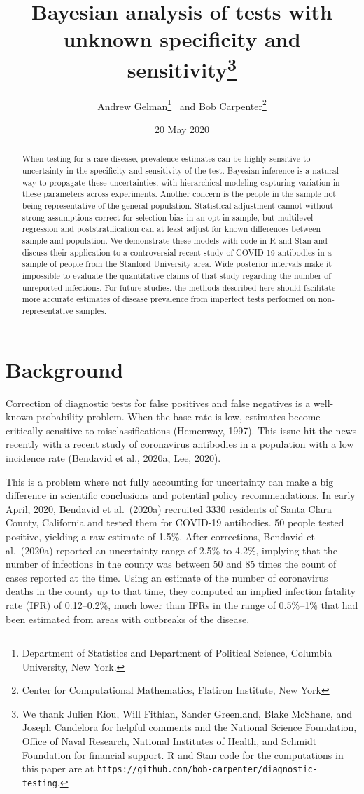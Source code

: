 \documentclass[11pt]{article}
\title{\bf Bayesian analysis of tests with unknown specificity and sensitivity\footnote{We thank Julien Riou, Will Fithian, Sander Greenland, Blake McShane, and Joseph Candelora for helpful comments and the National Science Foundation, Office of Naval Research, National Institutes of Health, and Schmidt Foundation for financial support.  R and Stan code for the computations in this paper are at {\tt https://github.com/bob-carpenter/diagnostic-testing}.}\vspace{.1in}}
\author{Andrew Gelman\footnote{Department of Statistics and Department of
Political Science, Columbia University, New York.}  \ and Bob Carpenter\footnote{Center for Computational Mathematics, Flatiron Institute, New York}
\vspace{.1in}}
\date{20 May 2020}
\begin{document}
\sloppy
\maketitle

\begin{abstract}
When testing for a rare disease, prevalence estimates can be highly sensitive to uncertainty in the specificity and sensitivity of the test.  Bayesian inference is a natural way to propagate these uncertainties, with hierarchical modeling capturing variation in these parameters across experiments.  Another concern is the people in the sample not being representative of the general population.  Statistical adjustment cannot without strong assumptions correct for selection bias in an opt-in sample, but multilevel regression and poststratification can at least adjust for known differences between sample and population.  We demonstrate these models with code in R and Stan and discuss their application to a controversial recent study of COVID-19 antibodies in a sample of people from the Stanford University area.  Wide posterior intervals make it impossible to evaluate the quantitative claims of that study regarding the number of unreported infections.  For future studies, the methods described here should facilitate more accurate estimates of disease prevalence from imperfect tests performed on non-representative samples.
\end{abstract}

\section{Background}

Correction of diagnostic tests for false positives and false negatives is a well-known probability problem.  When the base rate is low, estimates become critically sensitive to misclassifications (Hemenway, 1997).  This issue hit the news recently with a recent study of coronavirus antibodies in a population with a low incidence rate (Bendavid et al., 2020a, Lee, 2020).

This is a problem where not fully accounting for uncertainty can make a big difference in scientific conclusions and potential policy recommendations.  In early April, 2020, Bendavid et al.\ (2020a) recruited 3330 residents of Santa Clara County, California and tested them for COVID-19 antibodies.  50 people tested positive, yielding a raw estimate of 1.5\%.  After corrections, Bendavid et al.\ (2020a) reported an uncertainty range of 2.5\% to 4.2\%, implying that the number of infections in the county was between 50 and 85 times the count of cases reported at the time.  Using an estimate of the number of coronavirus deaths in the county up to that time, they computed an implied infection fatality rate (IFR) of 0.12--0.2\%, much lower than IFRs in the range of 0.5\%--1\% that had been estimated from areas with outbreaks of the disease.
\end{document}
